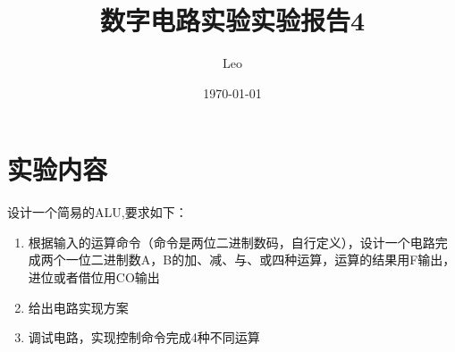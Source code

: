 \documentclass{ctexart}
\title{数字电路实验\quad 实验报告4}
\author{Leo}
\date{\today}
\begin{document}
\maketitle
\section{实验内容}
设计一个简易的ALU,要求如下：
\begin{enumerate}
    \item 根据输入的运算命令（命令是两位二进制数码，自行定义），设计一个电路完成两个一位二进制数A，B的加、减、与、或四种运算，运算的结果用F输出，进位或者借位用CO输出
    \item 给出电路实现方案
    \item 调试电路，实现控制命令完成4种不同运算
\end{enumerate}
\end{document}
